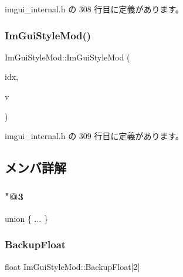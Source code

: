  imgui\+\_\+internal.\+h の 308 行目に定義があります。

\mbox{\label{struct_im_gui_style_mod_a28647cc4ab8b95b8ee30e0fc7401ae07}} 
\subsubsection{\texorpdfstring{Im\+Gui\+Style\+Mod()}{ImGuiStyleMod()}\hspace{0.1cm}{\footnotesize\ttfamily [3/3]}}
{\footnotesize\ttfamily Im\+Gui\+Style\+Mod\+::\+Im\+Gui\+Style\+Mod (\begin{DoxyParamCaption}\item[{\mbox{\hyperlink{imgui_8h_ac919acabce24faae590e295b424874ca}{Im\+Gui\+Style\+Var}}}]{idx,  }\item[{\mbox{\hyperlink{struct_im_vec2}{Im\+Vec2}}}]{v }\end{DoxyParamCaption})\hspace{0.3cm}{\ttfamily [inline]}}



 imgui\+\_\+internal.\+h の 309 行目に定義があります。



\subsection{メンバ詳解}
\mbox{\label{struct_im_gui_style_mod_aecd20df739984d80e5a90a7c12927fd1}} 
\subsubsection{\texorpdfstring{"@3}{@3}}
{\footnotesize\ttfamily union \{ ... \} }

\mbox{\label{struct_im_gui_style_mod_af36b5cf1100de970d78a53db937be949}} 
\subsubsection{\texorpdfstring{Backup\+Float}{BackupFloat}}
{\footnotesize\ttfamily float Im\+Gui\+Style\+Mod\+::\+Backup\+Float\mbox{[}2\mbox{]}}



